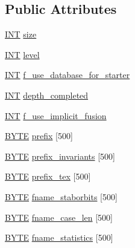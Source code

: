 \subsection*{Public Attributes}
\begin{DoxyCompactItemize}
\item 
\mbox{\hyperlink{galois_8h_a09fddde158a3a20bd2dcadb609de11dc}{I\+NT}} \mbox{\hyperlink{classisomorph_aaf000e8a442c4b08d230f7502cf06c13}{size}}
\item 
\mbox{\hyperlink{galois_8h_a09fddde158a3a20bd2dcadb609de11dc}{I\+NT}} \mbox{\hyperlink{classisomorph_a95cd884738d351f31d8688b49c783dee}{level}}
\item 
\mbox{\hyperlink{galois_8h_a09fddde158a3a20bd2dcadb609de11dc}{I\+NT}} \mbox{\hyperlink{classisomorph_a52a672cae28d841d56e07b6c53566532}{f\+\_\+use\+\_\+database\+\_\+for\+\_\+starter}}
\item 
\mbox{\hyperlink{galois_8h_a09fddde158a3a20bd2dcadb609de11dc}{I\+NT}} \mbox{\hyperlink{classisomorph_aec64e5908dd89d1ab568e95430a117fd}{depth\+\_\+completed}}
\item 
\mbox{\hyperlink{galois_8h_a09fddde158a3a20bd2dcadb609de11dc}{I\+NT}} \mbox{\hyperlink{classisomorph_a7fbf3c10d1f30d338e874ed6f0981230}{f\+\_\+use\+\_\+implicit\+\_\+fusion}}
\item 
\mbox{\hyperlink{galois_8h_ab6cc7b4aeb6ea31aba2b3fbfc83ff5e6}{B\+Y\+TE}} \mbox{\hyperlink{classisomorph_a8438e383d6c346392fc2fc5a0906d7eb}{prefix}} \mbox{[}500\mbox{]}
\item 
\mbox{\hyperlink{galois_8h_ab6cc7b4aeb6ea31aba2b3fbfc83ff5e6}{B\+Y\+TE}} \mbox{\hyperlink{classisomorph_a861807873dc40394eb6dc5eb803e348d}{prefix\+\_\+invariants}} \mbox{[}500\mbox{]}
\item 
\mbox{\hyperlink{galois_8h_ab6cc7b4aeb6ea31aba2b3fbfc83ff5e6}{B\+Y\+TE}} \mbox{\hyperlink{classisomorph_a70c958634e011bc67b8ef5c08fa5507d}{prefix\+\_\+tex}} \mbox{[}500\mbox{]}
\item 
\mbox{\hyperlink{galois_8h_ab6cc7b4aeb6ea31aba2b3fbfc83ff5e6}{B\+Y\+TE}} \mbox{\hyperlink{classisomorph_aaa935963b65365c9ec55f9a1c81700fa}{fname\+\_\+staborbits}} \mbox{[}500\mbox{]}
\item 
\mbox{\hyperlink{galois_8h_ab6cc7b4aeb6ea31aba2b3fbfc83ff5e6}{B\+Y\+TE}} \mbox{\hyperlink{classisomorph_a89a6ab97c43b1e540396373acbef3969}{fname\+\_\+case\+\_\+len}} \mbox{[}500\mbox{]}
\item 
\mbox{\hyperlink{galois_8h_ab6cc7b4aeb6ea31aba2b3fbfc83ff5e6}{B\+Y\+TE}} \mbox{\hyperlink{classisomorph_ac1fb0bec5bae86af5b881825922d53b2}{fname\+\_\+statistics}} \mbox{[}500\mbox{]}

\end{DoxyCompactItemize}
